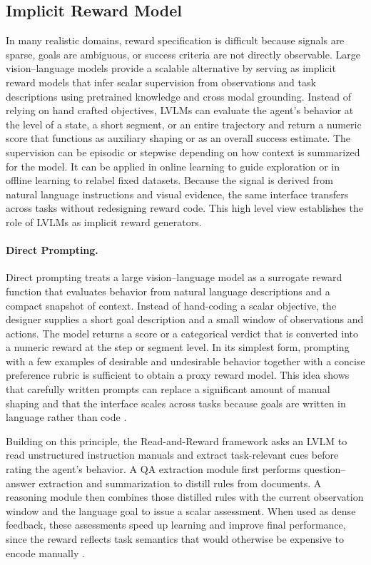 \documentclass[master,english,final]{kaist-ucs}
\begin{document}
\subsection{Implicit Reward Model}
In many realistic domains, reward specification is difficult because signals are sparse, goals are ambiguous, or success criteria are not directly observable. Large vision–language models provide a scalable alternative by serving as implicit reward models that infer scalar supervision from observations and task descriptions using pretrained knowledge and cross modal grounding. Instead of relying on hand crafted objectives, LVLMs can evaluate the agent’s behavior at the level of a state, a short segment, or an entire trajectory and return a numeric score that functions as auxiliary shaping or as an overall success estimate. The supervision can be episodic or stepwise depending on how context is summarized for the model. It can be applied in online learning to guide exploration or in offline learning to relabel fixed datasets. Because the signal is derived from natural language instructions and visual evidence, the same interface transfers across tasks without redesigning reward code. This high level view establishes the role of LVLMs as implicit reward generators.

\paragraph{Direct Prompting. }
Direct prompting treats a large vision–language model as a surrogate reward function that evaluates behavior from natural language descriptions and a compact snapshot of context. Instead of hand-coding a scalar objective, the designer supplies a short goal description and a small window of observations and actions. The model returns a score or a categorical verdict that is converted into a numeric reward at the step or segment level. In its simplest form, prompting with a few examples of desirable and undesirable behavior together with a concise preference rubric is sufficient to obtain a proxy reward model. This idea shows that carefully written prompts can replace a significant amount of manual shaping and that the interface scales across tasks because goals are written in language rather than code \cite{kwon2023reward}.

Building on this principle, the Read-and-Reward framework\cite{wu2023read} asks an LVLM to read unstructured instruction manuals and extract task-relevant cues before rating the agent’s behavior. A QA extraction module first performs question–answer extraction and summarization to distill rules from documents. A reasoning module then combines those distilled rules with the current observation window and the language goal to issue a scalar assessment. When used as dense feedback, these assessments speed up learning and improve final performance, since the reward reflects task semantics that would otherwise be expensive to encode manually \cite{wu2023read}.
\end{document}

